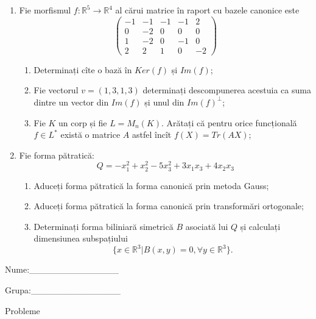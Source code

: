 \documentclass{article}
\begin{document}
\begin{enumerate}
 \item Fie morfismul $f:\mathbb{R}^5 \to \mathbb{R}^4$ al cărui matrice în raport cu bazele canonice este
$$\begin{pmatrix}
-1&-1&-1&-1&2\\
0&-2&0&0&0\\
1&-2&0&-1&0\\
2&2&1&0&-2
\end{pmatrix}$$

\begin{enumerate}
\item Determinați cîte o bază în $Ker(f)$ și $Im(f)$;
\item Fie vectorul $v=(1,3,1,3)$ determinați descompunerea acestuia ca suma dintre un vector din $Im(f)$ și unul din $Im(f)^\perp$;
\item Fie $K$ un corp și fie $L=M_n(K)$. Arătați că pentru orice funcțională $f \in L^*$ există o matrice $A$ astfel încît $f(X)=Tr(AX)$;
\end{enumerate}
\item Fie forma pătratică:
$$Q= -x_1^2+x_2^2-5x_3^2+3x_1x_3+4x_2x_3$$

\begin{enumerate}
\item Aduceți forma pătratică la forma canonică prin metoda Gauss;
\item Aduceți forma pătratică la forma canonică prin transformări ortogonale;
\item Determinați forma biliniară simetrică $B$ asociată lui $Q$ și calculați dimensiunea subspațiului
$$\{x \in \mathbb{R}^3 | B(x,y)=0,\forall y \in \mathbb{R}^3\}.$$

\end{enumerate}
\end{enumerate}
\newpage
\begin{flushright}
Nume:\_\_\_\_\_\_\_\_\_\_\_\_\_\_
 
 
Grupa:\_\_\_\_\_\_\_\_\_\_\_\_\_\_
\end{flushright}
\begin{center}
\vspace{2cm}
{\Large Probleme}
\vspace{2cm}
\end{center}
\end{document}
